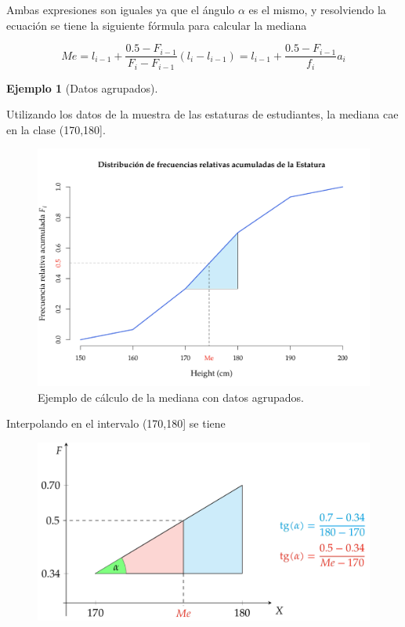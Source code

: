 \documentclass[
  a4paper,
]{scrreport}
\theoremstyle{plain}
\theoremstyle{definition}
\newtheorem{example}{Ejemplo}[chapter]
\theoremstyle{definition}
\theoremstyle{remark}
\begin{document}
Ambas expresiones son iguales ya que el ángulo \(\alpha\) es el mismo, y
resolviendo la ecuación se tiene la siguiente fórmula para calcular la
mediana

\[
Me=l_{i-1}+\frac{0.5-F_{i-1}}{F_i-F_{i-1}}(l_i-l_{i-1})=l_{i-1}+\frac{0.5-F_{i-1}}{f_i}a_i
\]

\begin{example}[Datos
agrupados]\protect\hypertarget{exm-mediana-datos-agrupados}{}\label{exm-mediana-datos-agrupados}

Utilizando los datos de la muestra de las estaturas de estudiantes, la
mediana cae en la clase (170,180{]}.

\begin{figure}[H]

{\centering \includegraphics{img/descriptiva/interpolacion_ejemplo_1.png}

}

\caption{Ejemplo de cálculo de la mediana con datos agrupados.}

\end{figure}%

Interpolando en el intervalo (170,180{]} se tiene

\begin{figure}[H]

{\centering \includegraphics{img/descriptiva/interpolacion_ejemplo_2.png}

}
\end{figure}
\end{example}
\end{document}

